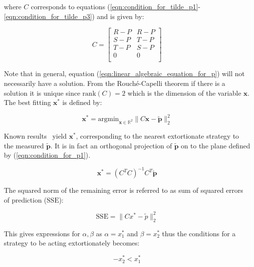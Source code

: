 \documentclass[a4paper]{article}
\newcommand{\SSe}{\text{SSE}}
\begin{document}
where \(C\) corresponds to equations
(\ref{eqn:condition_for_tilde_p1}-\ref{eqn:condition_for_tilde_p3}) and is
given by:

\begin{equation}\label{eqn:definition_of_C}
    C =
    \begin{bmatrix}
        R - P & R- P \\
        S - P & T- P \\
        T - P & S- P \\
        0     & 0 \\
    \end{bmatrix}
\end{equation}

Note that in general, equation (\ref{eqn:linear_algebraic_equation_for_p}) will
not necessarily have a solution. From the Rouch\'{e}-Capelli theorem if there is
a solution it is unique since \(\text{rank}(C)=2\) which is the dimension of the
variable \(\textbf{x}\). The best fitting \(\textbf{x}^*\) is defined by:

\begin{equation}\label{eqn:x_star}
    \textbf{x}^* = \text{argmin}_{\textbf{x}\in\mathbb{R}^2}\|C \textbf{x}- \tilde{\textbf{p}}\|_2^2
\end{equation}

Known results~\cite{kutner2004applied, rao1973linear, wakefield2013bayesian}
yield \(\textbf{x}^*\), corresponding to the nearest extortionate strategy to the measured
\(\tilde{\textbf{p}}\). It is in fact an orthogonal projection of
\(\tilde{\textbf{p}}\) on to the
plane defined by (\ref{eqn:condition_for_p1}).

\begin{equation}\label{eqn:x_star_formula}
    \textbf{x}^* = {\left(C^{T}C\right)}^{-1}C^{T}\tilde{\textbf{p}}
\end{equation}

The squared norm of the remaining error is referred to as sum of squared errors
of prediction (\(\SSe\)):

\begin{equation}\label{eqn:r_squared}
    \SSe = \|C x^*- \tilde p\|_2^2
\end{equation}

This gives expressions for \(\alpha, \beta\) as \(\alpha=x^*_1\) and
\(\beta=x^*_2\) thus the conditions for a strategy to be acting extortionately
becomes:

\begin{equation}
    -x^*_2 < x^*_1 \label{eqn:measured_condition_for_chi}
\end{equation}
\end{document}
